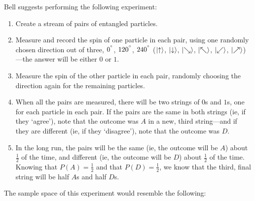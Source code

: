 \begin{definition}
    Bell suggests performing the following experiment:
    \begin{enumerate}
        \item Create a stream of pairs of entangled particles.
        \item Measure and record the spin of one particle in each pair, using one randomly chosen direction out of three, $0^{\degree}$, $120^{\degree}$, $240^{\degree}$ ($\lvert\uparrow\rangle$, $\lvert\downarrow\rangle$, $\lvert\searrow\rangle$, $\lvert\nwarrow\rangle$, $\lvert\swarrow\rangle$, $\lvert\nearrow\rangle$)---the answer will be either $0$ or $1$.
        \item Measure the spin of the other particle in each pair, randomly choosing the direction again for the remaining particles.
        \item When all the pairs are measured, there will be two strings of $0$s and $1$s, one for each particle in each pair. If the pairs are the same in both strings (ie, if they `agree'), note that the outcome was $A$ in a new, third string---and if they are different (ie, if they `disagree'), note that the outcome was $D$.
        \item In the long run, the pairs will be the same (ie, the outcome will be $A$) about $\frac{1}{2}$ of the time, and different (ie, the outcome will be $D$) about $\frac{1}{2}$ of the time. Knowing that $P(A) = \frac{1}{2}$ and that $P(D) = \frac{1}{2}$, we know that the third, final string will be half $A$s and half $D$s.
    \end{enumerate}

    The sample space of this experiment would resemble the following:\\


\end{definition}
